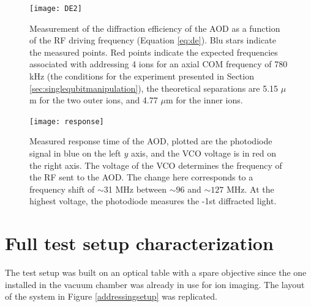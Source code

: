 \begin{figure}
\centering
\texttt{[image: DE2]}
\caption{Measurement of the diffraction efficiency of the AOD as a function of the RF driving frequency (Equation \eqref{eq:de}). Blu stars indicate the measured points. Red points indicate the expected frequencies associated with addressing 4 ions for an axial COM frequency of 780 kHz (the conditions for the experiment presented in Section \ref{sec:singlequbitmanipulation}), the theoretical separations are 5.15 $\mu$m for the two outer ions, and 4.77 $\mu$m for the inner ions.}
\label{DE}
\end{figure}

\begin{figure}
\centering
\texttt{[image: response]}
\caption{Measured response time of the AOD, plotted are the photodiode signal in blue on the left $y$ axis, and the VCO voltage is in red on the right axis. The voltage of the VCO determines the frequency of the RF sent to the AOD. The change here corresponds to a frequency shift of $\sim$31 MHz between $\sim 96$ and $\sim 127$ MHz. At the highest voltage, the photodiode measures the -1st diffracted light.}
\label{response}
\end{figure}

\section{Full test setup characterization}
\label{sec:fullsetup}
The test setup was built on an optical table with a spare objective since the one installed in the vacuum chamber was already in use for ion imaging. The layout of the system in Figure \ref{addressingsetup} was replicated.

